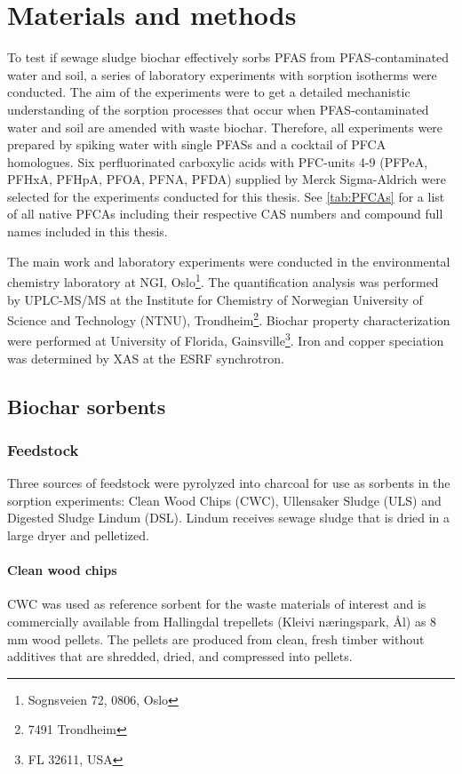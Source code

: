 \chapter{Materials and methods}\label{chap:MatlsMethds}
To test if sewage sludge biochar effectively sorbs PFAS from PFAS-contaminated water and soil, a series of laboratory experiments with sorption isotherms were conducted. The aim of the experiments were to get a detailed mechanistic understanding of the sorption processes that occur when PFAS-contaminated water and soil are amended with waste biochar. Therefore, all experiments were prepared by spiking water with single PFASs and a cocktail of PFCA homologues. Six perfluorinated carboxylic acids with PFC-units 4-9 (PFPeA, PFHxA, PFHpA, PFOA, PFNA, PFDA) supplied by Merck Sigma-Aldrich were selected for the experiments conducted for this thesis. See \cref{tab:PFCAs} for a list of all native PFCAs including their respective CAS numbers and compound full names included in this thesis.  

The main work and laboratory experiments were conducted in the environmental chemistry laboratory at NGI, Oslo\footnote{Sognsveien 72, 0806, Oslo}. The quantification analysis was performed by UPLC-MS/MS at the Institute for Chemistry of Norwegian University of Science and Technology (NTNU), Trondheim\footnote{7491 Trondheim}. Biochar property characterization were performed at University of Florida, Gainsville\footnote{FL 32611, USA}. Iron and copper speciation was determined by XAS at the ESRF synchrotron. 



\section{Biochar sorbents}

\subsection{Feedstock}

Three sources of feedstock were pyrolyzed into charcoal for use as sorbents in the sorption experiments: Clean Wood Chips (CWC), Ullensaker Sludge (ULS) and Digested Sludge Lindum (DSL). Lindum receives sewage sludge that is dried in a large dryer and pelletized.

\subsubsection{Clean wood chips}
CWC was used as reference sorbent for the waste materials of interest and is commercially available from Hallingdal trepellets (Kleivi næringspark, Ål) as 8 mm wood pellets. The pellets are produced from clean, fresh timber without additives that are shredded, dried, and compressed into pellets. 

